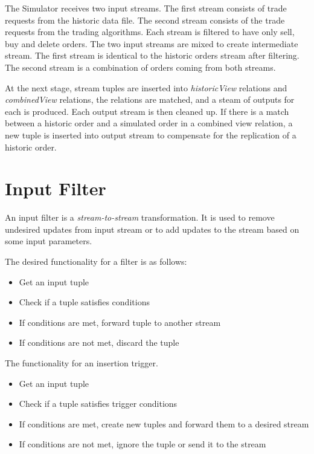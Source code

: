 \documentclass{article}
\begin{document}
The Simulator receives two input streams. The first stream consists of trade requests from the historic data file. The second stream consists of the trade requests from the trading algorithms. Each stream is filtered to have only sell, buy and delete orders. The two input streams are mixed to create intermediate stream. The first stream is identical to the historic orders stream after filtering. The second stream is a combination of orders coming from both streams. 

At the next stage, stream tuples are inserted into  \emph{historicView} relations and \emph{combinedView} relations, the relations are matched, and a steam of outputs for each is produced. Each output stream is then cleaned up. If there is a match between a historic order and a simulated order in a combined view relation, a new tuple is inserted into output stream to compensate for the replication of a historic order.


\section{Input Filter}

An input filter is a \emph{stream-to-stream} transformation. It is used to remove undesired updates from input stream or to add updates to the stream based on some input parameters.

The desired functionality for a filter is as follows:

\begin{itemize}
    \item Get an input tuple
    \item Check if a tuple satisfies conditions
    \item If conditions are met, forward tuple to another stream
    \item If conditions are not met, discard the tuple
\end{itemize}

The functionality for an insertion trigger.

\begin{itemize}
    \item Get an input tuple
    \item Check if a tuple satisfies trigger conditions
    \item If conditions are met, create new tuples and forward them to a desired stream
    \item If conditions are not met, ignore the tuple or send it to the stream
\end{itemize}
\end{document}

